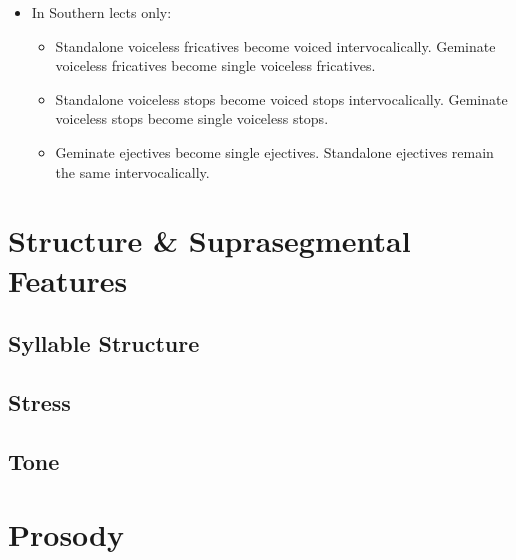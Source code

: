 \begin{itemize}
\begin{itemize}
    \end{itemize}
    \item In Southern lects only:
    \begin{itemize}
        \item Standalone voiceless fricatives become voiced intervocalically. Geminate voiceless fricatives become single voiceless fricatives.
        \item Standalone voiceless stops become voiced stops intervocalically. Geminate voiceless stops become single voiceless stops.
        \item Geminate ejectives become single ejectives. Standalone ejectives remain the same intervocalically.
    \end{itemize}
\end{itemize}

\section{Structure \& Suprasegmental Features}

\subsection{Syllable Structure}

\subsection{Stress}


\subsection{Tone}

\section{Prosody}

